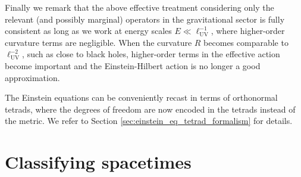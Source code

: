\documentclass[../geometry_main.tex]{subfiles}
\begin{document}
\begin{mytheorem}
Finally we remark that the above effective treatment considering only the relevant (and possibly marginal) operators in the gravitational sector is fully consistent as long as we work at energy scales $E\ll \ell_{\mathrm{UV}}^{-1}$, where higher-order curvature terms are negligible.
When the curvature $R$ becomes comparable to $\ell_{\mathrm{UV}}^{-2}$, such as close to black holes, higher-order terms in the effective action become important and the Einstein-Hilbert action is no longer a good approximation.
\end{mytheorem}


\begin{mytheorem}
%
The Einstein equations can be conveniently recast in terms of orthonormal tetrads, where the degrees of freedom are now encoded in the tetrads instead of the metric.
 We refer to Section \ref{sec:einstein_eq_tetrad_formalism} for details.
\end{mytheorem}






\section{Classifying spacetimes}
\end{document}
